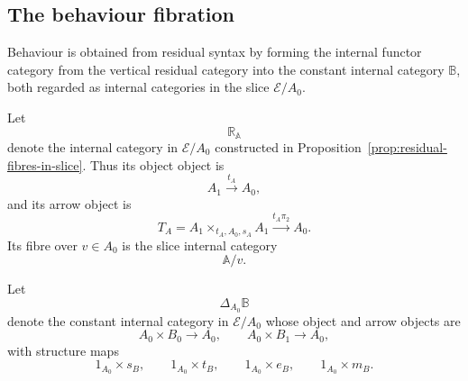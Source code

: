 \subsection{The behaviour fibration}
\label{subsec:behaviour-fibration}

Behaviour is obtained from residual syntax by forming the internal functor
category from the vertical residual category into the constant internal
category \(\mathbb B\), both regarded as internal categories in the slice
\(\mathcal E/A_0\).

\begin{notation}
\label{not:vertical-residual-category}
    Let
    \[
        \mathbb R_{\mathbb A}
    \]
    denote the internal category in \(\mathcal E/A_0\) constructed in
    Proposition~\ref{prop:residual-fibres-in-slice}. Thus its object object is
    \[
        A_1\xrightarrow{t_A}A_0,
    \]
    and its arrow object is
    \[
        T_A=A_1\times_{t_A,A_0,s_A}A_1
        \xrightarrow{t_A\pi_2}A_0.
    \]
    Its fibre over \(v\in A_0\) is the slice internal category
    \[
        \mathbb A/v.
    \]
\end{notation}

\begin{definition}
\label{def:constant-target-category-over-base}
    Let
    \[
        \Delta_{A_0}\mathbb B
    \]
    denote the constant internal category in \(\mathcal E/A_0\) whose object
    and arrow objects are
    \[
        A_0\times B_0\longrightarrow A_0,
        \qquad
        A_0\times B_1\longrightarrow A_0,
    \]
    with structure maps
    \[
        1_{A_0}\times s_B,
        \qquad
        1_{A_0}\times t_B,
        \qquad
        1_{A_0}\times e_B,
        \qquad
        1_{A_0}\times m_B.
    \]
\end{definition}

